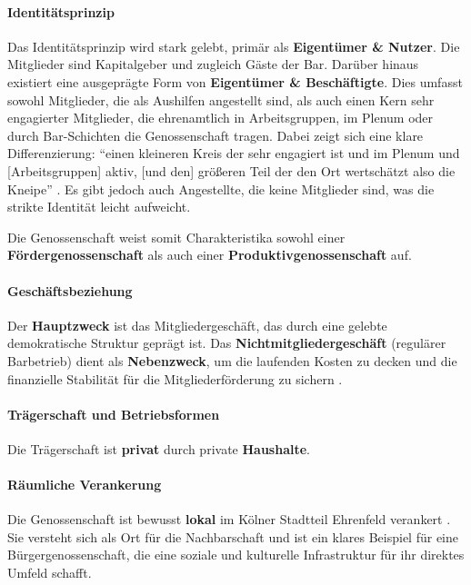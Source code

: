 \paragraph{Identitätsprinzip}
Das Identitätsprinzip wird stark gelebt, primär als \textbf{Eigentümer \& Nutzer}. Die Mitglieder sind Kapitalgeber und zugleich Gäste der Bar. Darüber hinaus existiert eine ausgeprägte Form von \textbf{Eigentümer \& Beschäftigte}. Dies umfasst sowohl Mitglieder, die als Aushilfen angestellt sind, als auch einen Kern sehr engagierter Mitglieder, die ehrenamtlich in Arbeitsgruppen, im Plenum oder durch Bar-Schichten die Genossenschaft tragen. Dabei zeigt sich eine klare Differenzierung: \enquote{einen kleineren Kreis der sehr engagiert ist und im Plenum und [Arbeitsgruppen] aktiv, [und den] größeren Teil der den Ort wertschätzt also die Kneipe} \parencite{mederInterviewZurGeschaftsmodellanalyse2025}. Es gibt jedoch auch Angestellte, die keine Mitglieder sind, was die strikte Identität leicht aufweicht.

Die Genossenschaft weist somit Charakteristika sowohl einer \textbf{Fördergenossenschaft} als auch einer \textbf{Produktivgenossenschaft} auf.

\paragraph{Geschäftsbeziehung}
Der \textbf{Hauptzweck} ist das Mitgliedergeschäft, das durch eine gelebte demokratische Struktur geprägt ist. Das \textbf{Nichtmitgliedergeschäft} (regulärer Barbetrieb) dient als \textbf{Nebenzweck}, um die laufenden Kosten zu decken und die finanzielle Stabilität für die Mitgliederförderung zu sichern \parencite{SatzungTRINKGENOSSE2019}.

\paragraph{Trägerschaft und Betriebsformen}
Die Trägerschaft ist \textbf{privat} durch private \textbf{Haushalte}.

\paragraph{Räumliche Verankerung}
Die Genossenschaft ist bewusst \textbf{lokal} im Kölner Stadtteil Ehrenfeld verankert \parencite{SatzungTRINKGENOSSE2019}. Sie versteht sich als Ort für die Nachbarschaft und ist ein klares Beispiel für eine Bürgergenossenschaft, die eine soziale und kulturelle Infrastruktur für ihr direktes Umfeld schafft.

